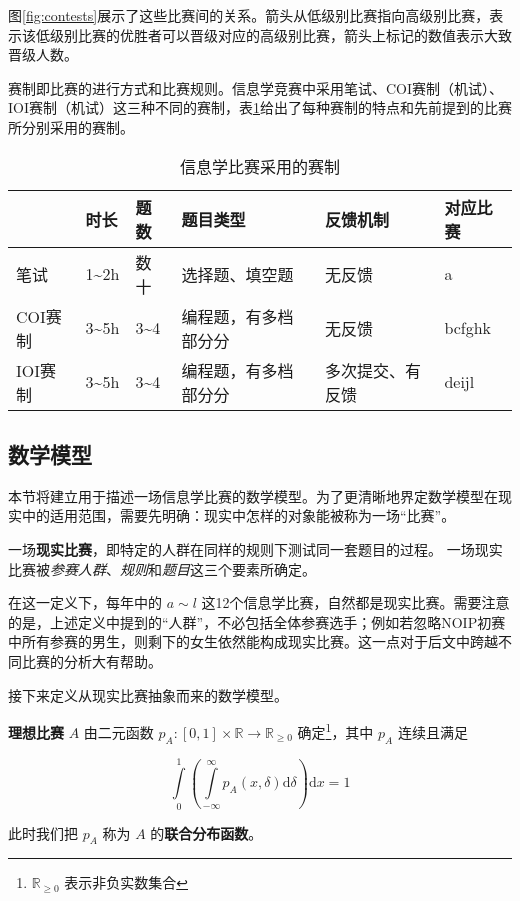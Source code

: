         图\ref{fig:contests}展示了这些比赛间的关系。箭头从低级别比赛指向高级别比赛，表示该低级别比赛的优胜者可以晋级对应的高级别比赛，箭头上标记的数值表示大致晋级人数。

        赛制即比赛的进行方式和比赛规则。信息学竞赛中采用笔试、COI赛制（机试）、IOI赛制（机试）这三种不同的赛制，表\ref{tab:formats}给出了每种赛制的特点和先前提到的比赛所分别采用的赛制。

        \begin{table}[hb]\small
            \centering
            \begin{tabular}{@{}llllll@{}}
                \toprule
                    & 时长                  & 题数                 & 题目类型       & 反馈机制       & 对应比赛   \\ \midrule
                笔试  & 1\textasciitilde 2h & 数十                 & 选择题、填空题     & 无反馈        & a      \\
                COI赛制 & 3\textasciitilde 5h & 3\textasciitilde 4 & 编程题，有多档部分分 & 无反馈        & bcfghk \\
                IOI赛制 & 3\textasciitilde 5h & 3\textasciitilde 4 & 编程题，有多档部分分 & 多次提交、有反馈 & deijl  \\ \bottomrule
            \end{tabular}
            \caption{信息学比赛采用的赛制}
            \label{tab:formats}
        \end{table}

    \subsection{数学模型}

        本节将建立用于描述一场信息学比赛的数学模型。为了更清晰地界定数学模型在现实中的适用范围，需要先明确：现实中怎样的对象能被称为一场“比赛”。

        \begin{definition}[现实比赛]
            一场\textbf{现实比赛}，即特定的人群在同样的规则下测试同一套题目的过程。
            一场现实比赛被\emph{参赛人群}、\emph{规则}和\emph{题目}这三个要素所确定。
        \end{definition}

        在这一定义下，每年中的 $a\sim l$ 这12个信息学比赛，自然都是现实比赛。需要注意的是，上述定义中提到的“人群”，不必包括全体参赛选手；例如若忽略NOIP初赛中所有参赛的男生，则剩下的女生依然能构成现实比赛。这一点对于后文中跨越不同比赛的分析大有帮助。
        
        接下来定义从现实比赛抽象而来的数学模型。

        \begin{definition}[理想比赛]
            \textbf{理想比赛} $A$ 由二元函数 $p_A:[0,1]\times\mathbb{R}\to\mathbb{R}_{\geq 0}$ 确定\footnote{ $\mathbb{R}_{\geq 0}$ 表示非负实数集合}，其中 $p_A$ 连续且满足
            
            $$
            \int\limits_0^1\left(\int\limits_{-\infty}^\infty p_A(x,\delta)\mathrm{d}\delta\right)\mathrm{d}x=1
            $$

            此时我们把 $p_A$ 称为 $A$ 的\textbf{联合分布函数}。
        \end{definition}
